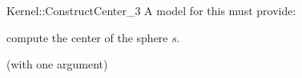 \begin{ccRefFunctionObjectConcept}{Kernel::ConstructCenter_3}
A model for this must provide:


 {compute the center of the sphere $s$.}

\ccRefines
{} (with one argument)

\ccSeeAlso
{}  \\

\end{ccRefFunctionObjectConcept}
